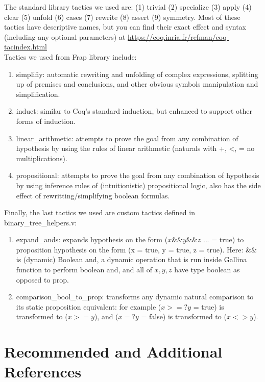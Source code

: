 \documentclass{article}
\begin{document}
The standard library tactics we used are: (1) trivial (2) specialize (3) apply (4) clear (5) unfold (6) cases (7) rewrite (8) assert (9) symmetry. Most of these tactics have descriptive names, but you can find their exact effect and syntax (including any optional parameters) at \href{https://coq.inria.fr/refman/coq-tacindex.html}{https://coq.inria.fr/refman/coq-tacindex.html} \\

Tactics we used from Frap library include:
\begin{enumerate}
    \item simplifiy: automatic rewriting and unfolding of complex expressions, splitting up of premises and conclusions, and other obvious symbols
                     manipulation and simplification.
    \item induct: similar to Coq's standard induction, but enhanced to support other forms of induction.
    \item linear\_arithmetic: attempts to prove the goal from any combination of hypothesis by using the rules of linear arithmetic (naturals with +, <, = no multiplications).
    \item propositional: attempts to prove the goal from any combination of hypothesis by using inference rules of (intuitionistic) propositional logic, also has the side effect
                         of rewritting/simplifying boolean formulas. \\
\end{enumerate}

Finally, the last tactics we used are custom tactics defined in binary\_tree\_helpers.v:
\begin{enumerate}
    \item expand\_ands: expands hypothesis on the form ($x \&\& y \&\& z$ ... = true) to proposition hypothesis on the form (x = true, y = true, z = true). Here: $\&\&$ is (dynamic) Boolean and, a dynamic operation that is run inside Gallina function to perform boolean and, and all of $x, y, z$ have type boolean as opposed to prop.
    \item comparison\_bool\_to\_prop: transforms any dynamic natural comparison to its static proposition equivalent: for example ($x >=? y$ = true) is transformed to ($x >= y$), and ($x =? y$ = false) is transformed to ($x <> y$).
\end{enumerate}

\section{Recommended and Additional References}
\end{document}
